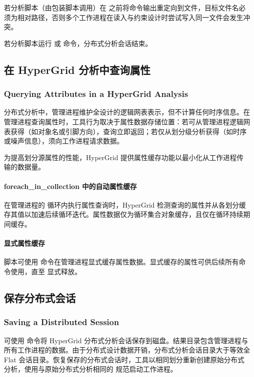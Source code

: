 若分析脚本（由包装脚本调用）在  之前将命令输出重定向到文件，目标文件名必须为相对路径，否则多个工作进程在读入与约束设计时尝试写入同一文件会发生冲突。

若分析脚本运行  或  命令，分布式分析会话结束。

\subsection{在 HyperGrid 分析中查询属性}
\subsubsection*{Querying Attributes in a HyperGrid Analysis}

分布式分析中，管理进程维护全设计的逻辑网表表示，但不计算任何时序信息。在管理进程查询属性时，工具行为取决于属性数据存储位置：若可从管理进程逻辑网表获得（如对象名或引脚方向），查询立即返回；若仅从划分级分析获得（如时序或噪声信息），须向工作进程请求数据。

为提高划分源属性的性能，HyperGrid 提供属性缓存功能以最小化从工作进程传输的数据量。

\paragraph{foreach\_in\_collection 中的自动属性缓存}
在管理进程的  循环内执行属性查询时，HyperGrid 检测查询的属性并从各划分缓存其值以加速后续循环迭代。属性数据仅为循环集合对象缓存，且仅在循环持续期间缓存。

\paragraph{显式属性缓存}
脚本可使用  命令在管理进程显式缓存属性数据。显式缓存的属性可供后续所有命令使用，直至  显式释放。

\subsection{保存分布式会话}
\subsubsection*{Saving a Distributed Session}

可使用  命令将 HyperGrid 分布式分析会话保存到磁盘。结果目录包含管理进程与所有工作进程的数据。由于分布式设计数据开销，分布式分析会话目录大于等效全 Flat 会话目录。恢复保存的分布式会话时，工具以相同划分重新创建原始分布式分析，使用与原始分布式分析相同的  规范启动工作进程。

